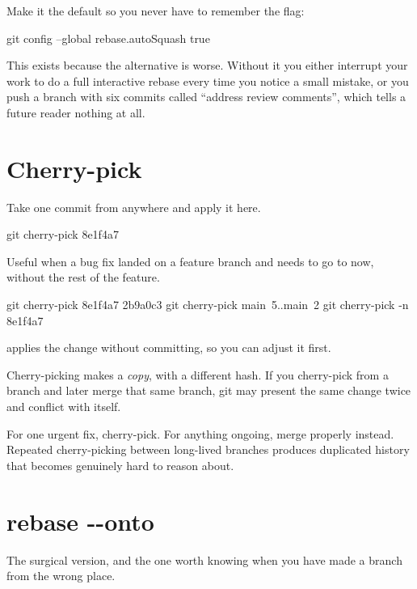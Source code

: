 \documentclass[11pt]{article}
\begin{document}
Make it the default so you never have to remember the flag:

\begin{shell}
git config --global rebase.autoSquash true
\end{shell}

\begin{why}
This exists because the alternative is worse. Without it you either interrupt your
work to do a full interactive rebase every time you notice a small mistake, or you
push a branch with six commits called ``address review comments'', which tells a
future reader nothing at all.
\end{why}

\section{Cherry-pick}

Take one commit from anywhere and apply it here.

\begin{shell}
git cherry-pick 8e1f4a7
\end{shell}

Useful when a bug fix landed on a feature branch and needs to go to  now,
without the rest of the feature.

\begin{shell}
git cherry-pick 8e1f4a7 2b9a0c3
git cherry-pick main~5..main~2
git cherry-pick -n 8e1f4a7
\end{shell}

 applies the change without committing, so you can adjust it first.

\begin{trap}
Cherry-picking makes a \emph{copy}, with a different hash. If you cherry-pick from a
branch and later merge that same branch, git may present the same change twice and
conflict with itself.

For one urgent fix, cherry-pick. For anything ongoing, merge properly instead.
Repeated cherry-picking between long-lived branches produces duplicated history that
becomes genuinely hard to reason about.
\end{trap}

\section{rebase -{}-onto}

The surgical version, and the one worth knowing when you have made a branch from the
wrong place.
\end{document}
